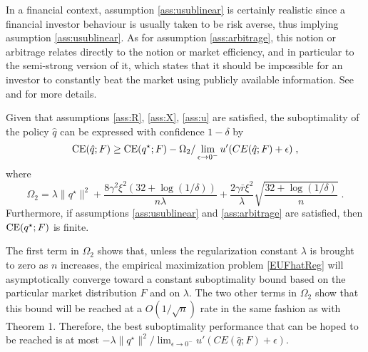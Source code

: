 In a financial context, assumption \ref{ass:usublinear} is certainly realistic since a
financial investor behaviour is usually taken to be risk averse, thus implying asumption
\ref{ass:usublinear}.  As for assumption \ref{ass:arbitrage}, this notion or arbitrage relates
directly to the notion or market efficiency, and in particular to the semi-strong version
of it, which states that it should be impossible for an investor to constantly beat the
market using publicly available information. See \cite{malkiel1970efficient} and
\cite{fama1991efficient} for more details.

\begin{thm}
  \label{thm_truopt}
  Given that assumptions \ref{ass:R}, \ref{ass:X}, \ref{ass:u} are satisfied, the
  suboptimality of the policy $\hat q$ can be expressed with confidence $1-\delta$ by
  \[
    \operatorname{CE}(\hat q;F) \geq \operatorname{CE}(q^\star;F) - \Omega_2/\lim_{\epsilon\to0^{-}}u'(CE(\hat q;F)+\epsilon)\;,
  \]
  where
  \[
    \Omega_2 = \lambda\|q^\star\|^2 +\frac{8\gamma^2\xi^2(32+\log(1/\delta))}{n\lambda} +\frac{2\gamma\bar
    r\xi^2}{\lambda}\sqrt{\frac{32+\log(1/\delta)}{n}}\;.
  \]
  Furthermore, if assumptions \ref{ass:usublinear} and \ref{ass:arbitrage} are satisfied, then
  $\operatorname{CE}(q^\star;F)$ is finite. 
\end{thm}

The first term in $\Omega_2$ shows that, unless the regularization constant $\lambda$ is
brought to zero as $n$ increases, the empirical maximization problem \eqref{EUFhatReg}
will asymptotically converge toward a constant suboptimality bound based on the particular
market distribution $F$ and on $\lambda$. The two other terms in $\Omega_2$ show that this
bound will be reached at a $O(1/\sqrt{n})$ rate in the same fashion as with Theorem
1. Therefore, the best suboptimality performance that can be hoped to be reached is at
most $-\lambda\|q^\star\|^2 /\lim_{\epsilon\to0^{-}}u'(CE(\hat q;F)+\epsilon)$.


